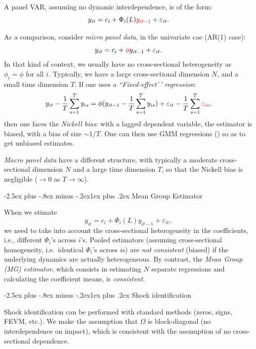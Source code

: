 \documentclass[
  11pt,
]{book}
\makeatletter
\renewcommand\subsection{\@startsection{subsection}{2}{\z@}
  {-2.5ex plus -.8ex minus -.2ex}{1ex plus .2ex}
  {\normalfont\large\bfseries\color{TextbookInk}}}
\theoremstyle{definition}
\theoremstyle{definition}
\theoremstyle{definition}
\theoremstyle{definition}
\theoremstyle{remark}
\makeatother
\begin{document}
A panel VAR, assuming no dynamic interdependence, is of the form:
\[ y_{it}=c_i+\Phi_i(L)
{\color{red}y_{it-1}}+\varepsilon_{it}.\]

As a comparison, consider \emph{micro panel data}, in the univariate cae (AR(1) case): \[y_{it}=c_i+{\color{red}\phi} y_{it-1}+\varepsilon_{it}.\] In that kind of context, we usually have no cross-sectional heterogeneity as \(\phi_i=\phi\) for all \(i\). Typically, we have a large cross-sectional dimension \(N\), and a small time dimension \(T\). If one uses a \emph{``Fixed-effect'\,' regression}:
\[y_{it}-\frac{1}{T}\sum_{s=1}^Ty_{is}=\phi(y_{it-1}-\frac{1}{T}\sum_{s=1}^Ty_{is})+\varepsilon_{it}-\frac{1}{T}\sum_{s=1}^T{\color{red}\varepsilon_{is}},\]
then one faces the \emph{Nickell bias}: with a lagged dependent variable, the estimator is biased, with a bias of size \(\sim 1/T\). One can then use GMM regressions (\citet{Arellano_Bond_1991}) so as to get unbiased estimates.

\emph{Macro panel data} have a different structure, with typically a moderate cross-sectional dimension \(N\) and a large time dimension \(T\), so that the Nickell bias is negligible (\(\rightarrow 0\) as \(T\rightarrow\infty\)).

\subsection{Mean Group Estimator}\label{mean-group-estimator}

When we etimate
\[ y_{it}=c_i+\Phi_i(L)
y_{it-1}+\varepsilon_{it},\]
we need to take into account the cross-sectional heterogeneity in the coefficients, i.e., different \(\Phi_i\)'s across \(i\)'s.
Pooled estimators (assuming cross-sectional homogeneity, i.e.~identical \(\Phi_i\)'s across \(i\)s) are \emph{not consistent} (biased) if the underlying dynamics are actually heterogeneous. By contrast, the \emph{Mean Group (MG) estimator}, which consists in estimating \(N\) separate regressions
and calculating the coefficient means, is \emph{consistent}.

\subsection{Shock identification}\label{shock-identification}

Shock identification can be performed with standard methods (zeros, signs, FEVM, etc.). We make the assumption that \(\Omega\) is block-diagonal (no interdependence on impact), which is consistent with the assumption of no cross-sectional dependence.
\end{document}
